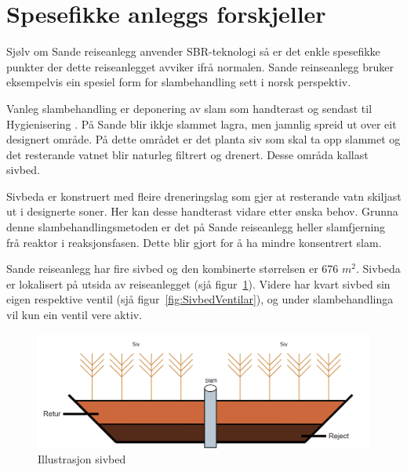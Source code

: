 \newpage
\section{Spesefikke anleggs forskjeller}
\thispagestyle{fancy}

Sjølv om Sande reiseanlegg anvender \gls{SBR}-teknologi så er det enkle spesefikke
punkter der dette reiseanlegget avviker ifrå normalen. 
Sande reinseanlegg bruker eksempelvis ein spesiel form for slambehandling sett i norsk perspektiv.

Vanleg slambehandling er deponering av slam som handterast og sendast til \gls{Hygienisering} \citep{Slam}.
På Sande blir ikkje slammet lagra, men jamnlig spreid ut over eit designert område. På dette området er
det planta siv som skal ta opp slammet og det resterande vatnet blir naturleg filtrert og drenert.
Desse områda kallast sivbed.

Sivbeda er konstruert med fleire dreneringslag som gjer at resterande vatn skiljast ut i designerte soner.
Her kan desse handterast vidare etter ønska behov. 
Grunna denne slambehandlingsmetoden er det på Sande reiseanlegg heller slamfjerning frå reaktor
i reaksjonsfasen. Dette blir gjort for å ha mindre konsentrert slam.

Sande reiseanlegg har fire sivbed og den kombinerte størrelsen er 676 $m^2$. Sivbeda er lokalisert på utsida av reiseanlegget (sjå figur~\ref{fig:Sivbed}).\newline
Videre har kvart sivbed sin eigen respektive ventil (sjå figur~\ref{fig:SivbedVentilar}), og under slambehandlinga vil kun ein ventil vere aktiv. 
 

\begin{figure}[htbp]
    \centering
    \includegraphics[width=1\textwidth]{Figurar/Sivbed.png}
    \caption{Illustrasjon sivbed}\label{fig:Sivbed}
\end{figure}

\newpage


